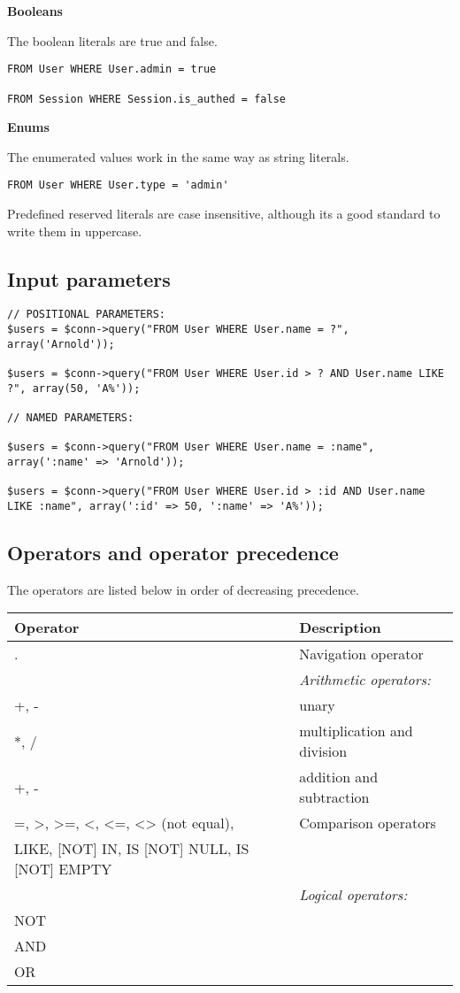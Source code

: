 \documentclass[11pt,a4paper]{report}
\begin{document}
\textbf{Booleans}

The boolean literals are true and false.

\begin{verbatim}
FROM User WHERE User.admin = true

FROM Session WHERE Session.is_authed = false
\end{verbatim}

\textbf{Enums}

The enumerated values work in the same way as string literals.

\begin{verbatim}
FROM User WHERE User.type = 'admin'
\end{verbatim}

Predefined reserved literals are case insensitive, although its a good standard to write them in uppercase.

\subsection{Input parameters}
\begin{verbatim}
// POSITIONAL PARAMETERS:
$users = $conn->query("FROM User WHERE User.name = ?", array('Arnold'));

$users = $conn->query("FROM User WHERE User.id > ? AND User.name LIKE ?", array(50, 'A%'));

// NAMED PARAMETERS:

$users = $conn->query("FROM User WHERE User.name = :name", array(':name' => 'Arnold'));

$users = $conn->query("FROM User WHERE User.id > :id AND User.name LIKE :name", array(':id' => 50, ':name' => 'A%'));
\end{verbatim}

\subsection{Operators and operator precedence}
The operators are listed below in order of decreasing precedence.

\begin{tabular}{|l|l|}
\hline
Operator & Description\\
\hline
. & Navigation operator\\
\hline
 & \textsl{Arithmetic operators: }\\
\hline
+, - & unary\\
\hline
*, / & multiplication and division\\
\hline
+, - & addition and subtraction\\
\hline
=, >, >=, <, <=, <> (not equal), & Comparison operators\\
\hline
[NOT] LIKE, [NOT] IN, IS [NOT] NULL, IS [NOT] EMPTY & \\
\hline
 & \textsl{Logical operators: }\\
\hline
NOT & \\
\hline
AND & \\
\hline
OR & \\
\hline
\end{tabular}
\end{document}
